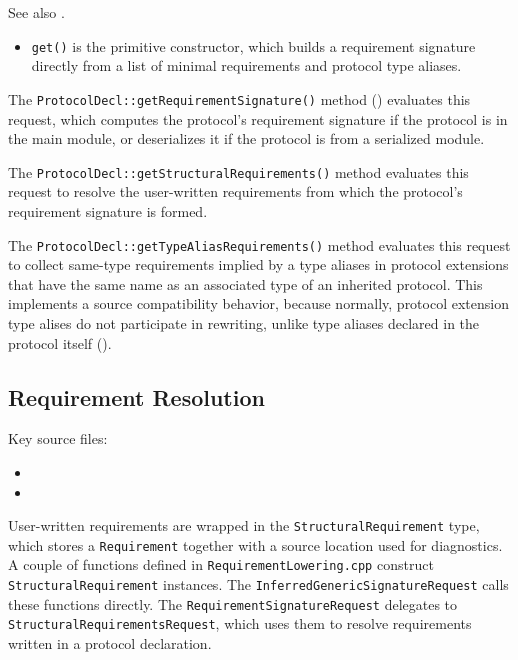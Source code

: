 \documentclass[../generics]{subfiles}
\begin{document}
See also .
\begin{itemize}
\item \texttt{get()} is the primitive constructor, which builds a requirement signature directly from a list of minimal requirements and protocol type aliases.
\end{itemize}

The \texttt{ProtocolDecl::getRequirementSignature()} method () evaluates this request, which computes the protocol's requirement signature if the protocol is in the main module, or deserializes it if the protocol is from a serialized module.

The \texttt{ProtocolDecl::getStructuralRequirements()} method evaluates this request to resolve the user-written requirements from which the protocol's requirement signature is formed.

The \texttt{ProtocolDecl::getTypeAliasRequirements()} method evaluates this request to collect same-type requirements implied by a type aliases in protocol extensions that have the same name as an associated type of an inherited protocol. This implements a source compatibility behavior, because normally, protocol extension type alises do not participate in rewriting, unlike type aliases declared in the protocol itself ().

\subsection*{Requirement Resolution}

Key source files:
\begin{itemize}
\item {}
\item {}
\end{itemize}

User-written requirements are wrapped in the \texttt{StructuralRequirement} type, which stores a \texttt{Requirement} together with a source location used for diagnostics. A couple of functions defined in \texttt{RequirementLowering.cpp} construct \texttt{StructuralRequirement} instances. The \texttt{InferredGenericSignatureRequest} calls these functions directly. The \texttt{RequirementSignatureRequest} delegates to \texttt{StructuralRequirementsRequest}, which uses them to resolve requirements written in a protocol declaration.
\end{document}
